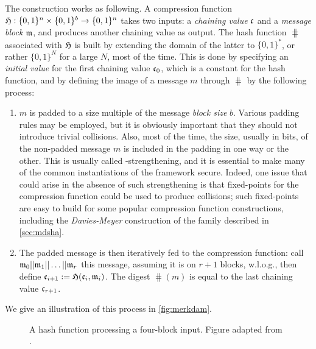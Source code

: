 The construction works as following. A compression function $\operatorname{\mathfrak{H}} : \{0,1\}^n \times \{0,1\}^b \rightarrow \{0,1\}^n$
takes two inputs: a \emph{chaining value} $\mathfrak{c}$ and a \emph{message block} $\mathfrak{m}$, and produces another chaining value as output.
The hash function $\hash$ associated with $\operatorname{\mathfrak{H}}$ is built by extending the domain of the latter to $\{0,1\}^*$, or rather $\{0,1\}^N$ for a large $N$, most of the time.
This is done by specifying an \emph{initial value} \iv for the first chaining value $\mathfrak{c}_0$, which is a constant for the hash function, and by defining the image
of a message $m$ through $\hash$ by the following process:
\begin{enumerate}
\item $m$ is padded to a size multiple of the message \emph{block size} $b$. Various padding rules may be employed, but it is obviously important that they should not
introduce trivial collisions. Also, most of the time, the size, usually in bits, of the non-padded message $m$ is included in the padding in one way or the other.
This is usually called \merkdam-strengthening, and it is essential to make many of the common instantiations of the framework secure. Indeed, one issue that
could arise in the absence of such strengthening is that fixed-points for the compression function could be used to produce collisions; such fixed-points
are easy to build for some popular compression function constructions, including the \emph{Davies-Meyer} construction
of the \mdsha family described in \autoref{sec:mdsha}.
\item The padded message is then iteratively fed to the compression function: call $\messblock_0||\messblock_1||\linebreak\ldots||\messblock_r$ this message, assuming
it is on $r+1$ blocks, w.l.o.g., then define $\mathfrak{c}_{i+1} := \operatorname{\mathfrak{H}}(\mathfrak{c}_i, \mathfrak{m}_i)$. The digest $\hash(m)$ is equal to the last
chaining value $\mathfrak{c}_{r+1}$.
\end{enumerate}
We give an illustration of this process in \autoref{fig:merkdam}.

\begin{figure}[!htb]
\begin{center}

\caption[A \merkdam hash function processing a four-block input.]{A \merkdam hash function processing a four-block input. Figure adapted from \cite{TiKZ:Cryptographers}.\label{fig:merkdam}}
\end{center}
\end{figure} 

